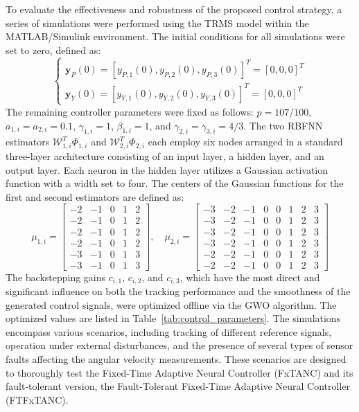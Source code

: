 To evaluate the effectiveness and robustness of the proposed control strategy, a series of simulations were performed using the TRMS model within the MATLAB/Simulink environment. The initial conditions for all simulations were set to zero, defined as:
\begin{equation}
    \begin{cases}
        \mathbf{y}_{P}(0) = [y_{P,1}(0), y_{P,2}(0), y_{P,3}(0)]^T = [0,0,0]^T \\
        \mathbf{y}_{Y}(0) = [y_{Y,1}(0), y_{Y,2}(0), y_{Y,3}(0)]^T = [0,0,0]^T
    \end{cases}
\end{equation}
The remaining controller parameters were fixed as follows: $p = 107/100$, $a_{1,i} = a_{2,i} = 0.1$, $\gamma_{1,i} = 1$, $\beta_{1,i} = 1$, and $\gamma_{2,i} = \gamma_{3,i} = 4/3$. The two RBFNN estimators $\mathcal{W}_{1,i}^{T}\Phi_{1,i}$ and $\mathcal{W}_{2,i}^{T}\Phi_{2,i}$ each employ six nodes arranged in a standard three-layer architecture consisting of an input layer, a hidden layer, and an output layer. Each neuron in the hidden layer utilizes a Gaussian activation function with a width set to four. The centers of the Gaussian functions for the first and second estimators are defined as:
\begin{equation}
    \mu_{1,i} =
    \begin{bmatrix}
        -2 & -1 & 0 & 1 & 2 \\
        -2 & -1 & 0 & 1 & 2 \\
        -2 & -1 & 0 & 1 & 2 \\
        -2 & -1 & 0 & 1 & 2 \\
        -3 & -1 & 0 & 1 & 3 \\
        -3 & -1 & 0 & 1 & 3
    \end{bmatrix}, \quad
    \mu_{2,i} =
    \begin{bmatrix}
        -3 & -2 & -1 & 0 & 0 & 1 & 2 & 3 \\
        -3 & -2 & -1 & 0 & 0 & 1 & 2 & 3 \\
        -3 & -2 & -1 & 0 & 0 & 1 & 2 & 3 \\
        -3 & -2 & -1 & 0 & 0 & 1 & 2 & 3 \\
        -2 & -2 & -1 & 0 & 0 & 1 & 2 & 3 \\
        -2 & -2 & -1 & 0 & 0 & 1 & 2 & 3
    \end{bmatrix}
\end{equation}
The backstepping gains $c_{i,1}$, $c_{i,2}$, and $c_{i,3}$, which have the most direct and significant influence on both the tracking performance and the smoothness of the generated control signals, were optimized offline via the GWO algorithm. The optimized values are listed in Table~\ref{tab:control_parameters}. The simulations encompass various scenarios, including tracking of different reference signals, operation under external disturbances, and the presence of several types of sensor faults affecting the angular velocity measurements. These scenarios are designed to thoroughly test the Fixed-Time Adaptive Neural Controller (FxTANC) and its fault-tolerant version, the Fault-Tolerant Fixed-Time Adaptive Neural Controller (FTFxTANC).

